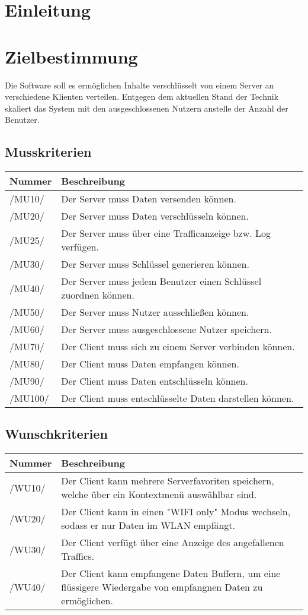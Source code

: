 \documentclass[a4paper,10pt]{article}
\title{\doctitle}
\author{\authorName}
\date{\today}
\newcommand\addrow[2]{#1 &#2\\ }
\newcommand\addheading[2]{#1 &#2\\ \hline}
\newcommand\tabularhead{\begin{tabular}{lp{13cm}}
\hline
}
\newenvironment{usecase}{\tabularhead}
{\hline\end{tabular}}
\begin{document}

\tableofcontents

\clearpage
\section{Einleitung}
\section{Zielbestimmung}
Die Software soll es ermöglichen Inhalte verschlüsselt von einem Server an verschiedene Klienten verteilen. Entgegen dem aktuellen Stand der Technik skaliert das System mit den ausgeschlossenen Nutzern anstelle der Anzahl der Benutzer.

\subsection{Musskriterien}
\newcommand{\mussKuerzel}{MU}
\begin{usecase}
\addheading{Nummer}{Beschreibung}
\addrow{/\mussKuerzel10/} {Der Server muss Daten versenden können.}
\addrow{/\mussKuerzel20/} {Der Server muss Daten verschlüsseln können.}
\addrow{/\mussKuerzel25/} {Der Server muss über eine Trafficanzeige bzw. Log verfügen.}
\addrow{/\mussKuerzel30/} {Der Server muss Schlüssel generieren können.}
\addrow{/\mussKuerzel40/} {Der Server muss jedem Benutzer einen Schlüssel zuordnen können.}
\addrow{/\mussKuerzel50/} {Der Server muss Nutzer ausschließen können.}
\addrow{/\mussKuerzel60/} {Der Server muss ausgeschlossene Nutzer speichern.}
\addrow{/\mussKuerzel70/} {Der Client muss sich zu einem Server verbinden können.}
\addrow{/\mussKuerzel80/} {Der Client muss Daten empfangen können.}
\addrow{/\mussKuerzel90/} {Der Client muss Daten entschlüsseln können.}
\addrow{/\mussKuerzel100/} {Der Client muss entschlüsselte Daten darstellen können.}
\end{usecase}

\subsection{Wunschkriterien}
\newcommand{\wunschKuerzel}{WU}
\begin{usecase}
\addheading{Nummer}{Beschreibung}
\addrow{/\wunschKuerzel10/} {Der Client kann mehrere Serverfavoriten speichern, welche über ein Kontextmenü auswählbar sind.}
\addrow{/\wunschKuerzel20/} {Der Client kann in einen "WIFI only" Modus wechseln, sodass er nur Daten im WLAN empfängt.}
\addrow{/\wunschKuerzel30/} {Der Client verfügt über eine Anzeige des angefallenen Traffics.}
\addrow{/\wunschKuerzel40/} {Der Client kann empfangene Daten Buffern, um eine flüssigere Wiedergabe von empfangnen Daten zu ermöglichen.}
\end{usecase}
\end{document}
